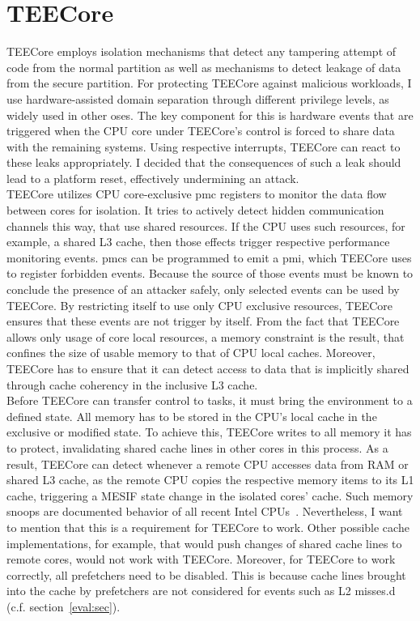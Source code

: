 \section{TEECore}
\label{sec:30:tee_kernel}
TEECore employs isolation mechanisms that detect any tampering attempt of code
from the normal partition as well as mechanisms to detect leakage of data from
the secure partition. For protecting TEECore against malicious workloads, I use
hardware-assisted domain separation through different privilege levels, as
widely used in other \gls{os}es. The key component for this is hardware events
that are triggered when the CPU core under TEECore's control is forced to share
data with the remaining systems. Using respective interrupts, TEECore can react
to these leaks appropriately. I decided that the consequences of such a leak
should lead to a platform reset, effectively undermining an attack.\\

TEECore utilizes CPU core-exclusive \gls{pmc} registers to monitor the data flow
between cores for isolation. It tries to actively detect hidden communication
channels this way, that use shared resources. If the CPU uses such resources,
for example, a shared L3 cache, then those effects trigger respective
performance monitoring events. \glspl{pmc} can be programmed to emit a
\gls{pmi}, which TEECore uses to register forbidden events. Because the source
of those events must be known to conclude the presence of an attacker safely,
only selected events can be used by TEECore. By restricting itself to use only
CPU exclusive resources, TEECore ensures that these events are not trigger by
itself. From the fact that TEECore allows only usage of core local resources, a
memory constraint is the result, that confines the size of usable memory to
that of CPU local caches. Moreover, TEECore has to ensure that it can detect
access to data that is implicitly shared through cache coherency in the
inclusive L3 cache.\\

Before TEECore can transfer control to tasks, it must bring the environment
to a defined state. All memory has to be stored in the CPU's local cache in the
exclusive or modified state. To achieve this, TEECore writes to all memory it
has to protect, invalidating shared cache lines in other cores in this process.
As a result, TEECore can detect whenever a remote CPU accesses data from RAM or
shared L3 cache, as the remote CPU copies the respective memory items to its L1
cache, triggering a MESIF state change in the isolated cores' cache. Such memory
snoops are documented behavior of all recent Intel CPUs~\cite{intel_sdm}.
Nevertheless, I want to mention that this is a requirement for TEECore to work.
Other possible cache implementations, for example, that would push changes of
shared cache lines to remote cores, would not work with TEECore. Moreover, for
TEECore to work correctly, all prefetchers need to be disabled. This is because
cache lines brought into the cache by prefetchers are not considered for events
such as L2 misses.d (c.f. section~\ref{eval:sec}).\\

